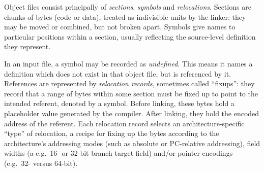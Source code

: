 Object files consist principally of \emph{sections}, \emph{symbols} and \emph{relocations}.
Sections are chunks of bytes (code or data), treated as indivisible units
by the linker: they may be moved or combined, but not broken apart. 
Symbols give names to particular positions within a section, 
usually reflecting the source-level definition they represent.

In an input file, a symbol may be recorded as \emph{undefined}.
This means it names a definition which does not exist in that object file, but is referenced by it.
References are represented by \emph{relocation records}, sometimes called 
``fixups'': they record that a range of bytes within some section must be fixed up 
to point to the intended referent, denoted by a symbol.
Before linking, these bytes hold a placeholder value generated by the compiler.
After linking, they hold the encoded address of the referent.
Each relocation record selects an architecture-specific ``type'' of relocation, 
a recipe for fixing up the bytes according to the architecture's
addressing modes (such as absolute or PC-relative addressing),
field widths (a e.g.\ 16- or 32-bit branch target field)
and/or pointer encodings (e.g.\ 32- versus 64-bit).

% 


